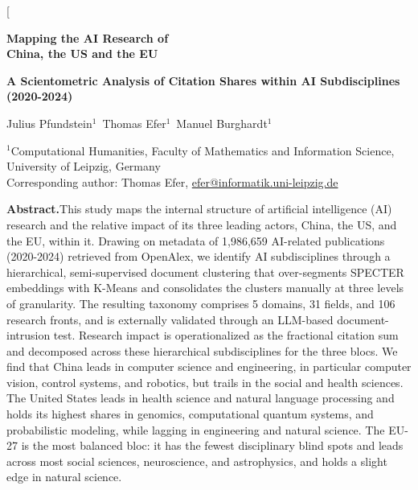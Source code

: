 \documentclass[10pt,twocolumn,a4paper]{article}
\begin{document}
	
	\thispagestyle{plain}
	\twocolumn[{%
		\begin{center}
			\begin{minipage}{0.93\textwidth}
				\centering
				{\LARGE\bfseries Mapping the AI Research of\\ China, the US and the EU\par}
				\vspace{0.45em}
				{\large\bfseries A Scientometric Analysis of Citation Shares within AI Subdisciplines (2020-2024)\par}
			\end{minipage}\par
			\vspace{1.2em}
			{\large Julius Pfundstein$^{1}$\,\quad
				Thomas Efer$^{1}$\,\quad
				Manuel Burghardt$^{1}$\,\par}
			\vspace{0.9em}
			{\small $^{1}$Computational Humanities, Faculty of Mathematics and Information Science, University of Leipzig, Germany\\[0.25em]
				Corresponding author: Thomas Efer, \href{mailto:efer@informatik.uni-leipzig.de}{efer@informatik.uni-leipzig.de}\par}
		\end{center}
		\vspace{1.0em}
		\begin{center}
			\begin{minipage}{0.88\textwidth}
				\small
				\noindent\textbf{Abstract.}\enspace This study maps the internal structure of artificial intelligence (AI) research and the relative impact of its three leading actors, China, the US, and the EU, within it. Drawing on metadata of 1,986,659 AI-related publications (2020-2024) retrieved from OpenAlex, we identify AI subdisciplines through a hierarchical, semi-supervised document clustering that over-segments SPECTER embeddings with K-Means and consolidates the clusters manually at three levels of granularity. The resulting taxonomy comprises 5 domains, 31 fields, and 106 research fronts, and is externally validated through an LLM-based document-intrusion test. Research impact is operationalized as the fractional citation sum and decomposed across these hierarchical subdisciplines for the three blocs. We find that China leads in computer science and engineering, in particular computer vision, control systems, and robotics, but trails in the social and health sciences. The United States leads in health science and natural language processing and holds its highest shares in genomics, computational quantum systems, and probabilistic modeling, while lagging in engineering and natural science. The EU-27 is the most balanced bloc: it has the fewest disciplinary blind spots and leads across most social sciences, neuroscience, and astrophysics, and holds a slight edge in natural science.
				

\end{minipage}
\end{center}}
\end{document}
